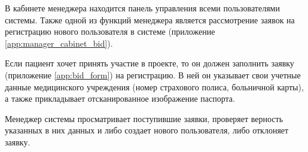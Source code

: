 В кабинете менеджера находится панель управления всеми пользователями системы.
Также одной из функций менеджера является рассмотрение заявок на регистрацию
нового пользователя в системе (приложение \ref{app:manager_cabinet_bid}).

Если пациент хочет принять участие в проекте, то он должен заполнить заявку
(приложение \ref{app:bid_form}) на регистрацию. В ней он указывает свои учетные
данные медицинского учреждения (номер страхового полиса, больничной карты), а
также прикладывает отсканированное изображение паспорта.

Менеджер системы просматривает поступившие заявки, проверяет верность указанных
в них данных и либо создает нового пользователя, либо отклоняет заявку.